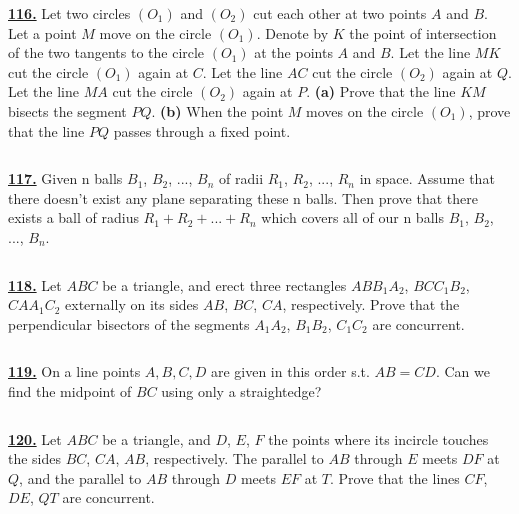 \documentclass{article}
\begin{document}
$$ $$





\href{http://www.artofproblemsolving.com/Forum/viewtopic.php?p=138570#p138570
 }{\bf 116.} Let two circles $\left(O_1\right)$ and $\left(O_2\right)$ cut each other at two points $A$ and $B$. Let a point $M$ move on the circle $\left(O_1\right)$. Denote by $K$ the point of intersection of the two tangents to the circle $\left(O_1\right)$ at the points $A$ and $B$. Let the line $MK$ cut the circle $\left(O_1\right)$ again at $C$. Let the line $AC$ cut the circle $\left(O_2\right)$ again at $Q$. Let the line $MA$ cut the circle $\left(O_2\right)$ again at $P$.
{\bf (a)} Prove that the line $KM$ bisects the segment $PQ$.
{\bf  (b)} When the point $M$ moves on the circle $\left(O_1\right)$, prove that the line $PQ$ passes through a fixed point.


$$ $$


\href{ http://www.artofproblemsolving.com/Forum/viewtopic.php?p=112682#p112682
}{\bf 117.} Given n balls $B_1$, $B_2$, ..., $B_n$ of radii $R_1$, $R_2$, ..., $R_n$ in space. Assume that there doesn't exist any plane separating these n balls. Then prove that there exists a ball of radius $R_1+R_2+...+R_n$ which covers all of our n balls $B_1$, $B_2$, ..., $B_n$.


$$ $$


\href{ http://www.artofproblemsolving.com/Forum/viewtopic.php?p=143442#p143442
}{\bf 118.} Let $ABC$ be a triangle, and erect three rectangles $ABB_1A_2$, $BCC_1B_2$, $CAA_1C_2$ externally on its sides $AB$, $BC$, $CA$, respectively. Prove that the perpendicular bisectors of the segments $A_1A_2$, $B_1B_2$, $C_1C_2$ are concurrent.


$$ $$


\href{ http://www.artofproblemsolving.com/Forum/viewtopic.php?p=112052#p112052
}{\bf 119.} On a line points $A,B,C,D$ are given in this order s.t. $AB=CD$. Can we find the midpoint of $BC$ using only a straightedge?


$$ $$


\href{ http://www.artofproblemsolving.com/Forum/viewtopic.php?p=143448#p143448
}{\bf 120.} Let $ABC$ be a triangle, and $D$, $E$, $F$ the points where its incircle touches the sides $BC$, $CA$, $AB$, respectively. The parallel to $AB$ through $E$ meets $DF$ at $Q$, and the parallel to $AB$ through $D$ meets $EF$ at $T$. Prove that the lines $CF$, $DE$, $QT$ are concurrent.


$$ $$
\end{document}
